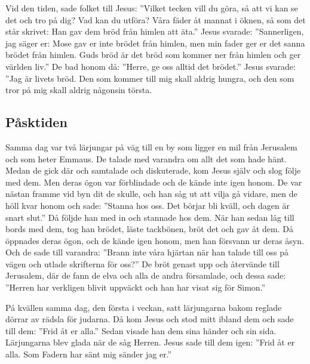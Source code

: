 
Vid den tiden, sade folket till Jesus: 
”Vilket tecken vill du göra, så att vi kan se det och tro på dig? Vad kan du utföra? Våra fäder åt mannat i öknen, så som det står skrivet: Han gav dem bröd från himlen att äta.” Jesus svarade: ”Sannerligen, jag säger er: Mose gav er inte brödet från himlen, men min fader ger er det sanna brödet från himlen.  Guds bröd är det bröd som kommer ner från himlen och ger världen liv.” De bad honom då: ”Herre, ge oss alltid det brödet.” Jesus svarade: ”Jag är livets bröd. Den som kommer till mig skall aldrig hungra, och den som tror på mig skall aldrig någonsin törsta. 




\subsection{Påsktiden}





Samma dag var två lärjungar på väg till en by som ligger en mil från Jerusalem och som heter Emmaus. De talade med varandra om allt det som hade hänt. 
Medan de gick där och samtalade och diskuterade, kom Jesus själv och slog följe med dem. Men deras ögon var förblindade och de kände inte igen honom. 
De var nästan framme vid byn dit de skulle, och han såg ut att vilja gå vidare, men de höll kvar honom och sade: ”Stanna hos oss. Det börjar bli kväll, och dagen är snart slut.” Då följde han med in och stannade hos dem. 
När han sedan låg till bords med dem, tog han brödet, läste tackbönen, bröt det och gav åt dem. 
Då öppnades deras ögon, och de kände igen honom, men han försvann ur deras åsyn. Och de sade till varandra: ”Brann inte våra hjärtan när han talade till oss på vägen och utlade skrifterna för oss?”
De bröt genast upp och återvände till Jerusalem, där de fann de elva och alla de andra församlade, och dessa sade: ”Herren har verkligen blivit uppväckt och han har visat sig för Simon.”



På kvällen samma dag, den första i veckan, satt lärjungarna bakom reglade dörrar av rädsla för judarna. Då kom Jesus och stod mitt ibland dem och sade till dem: ”Frid åt er alla.” Sedan visade han dem sina händer och sin sida. Lärjungarna blev glada när de såg Herren. 
Jesus sade till dem igen: ”Frid åt er alla. Som Fadern har sänt mig sänder jag er.”

